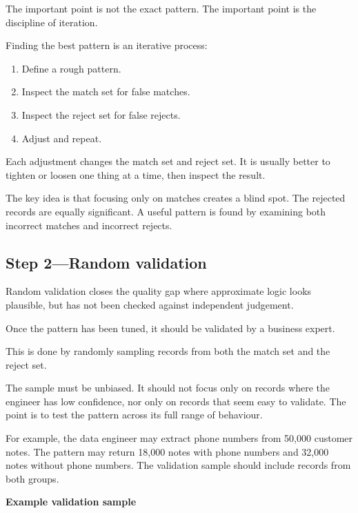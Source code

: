 \documentclass[10pt,openany,10pt]{book}
\providecommand{\tightlist}{%
  \setlength{\itemsep}{0pt}\setlength{\parskip}{0pt}}
\begin{document}
The important point is not the exact pattern. The important point is the
discipline of iteration.

Finding the best pattern is an iterative process:

\begin{enumerate}
\def\labelenumi{\arabic{enumi}.}
\tightlist
\item
  Define a rough pattern.
\item
  Inspect the match set for false matches.
\item
  Inspect the reject set for false rejects.
\item
  Adjust and repeat.
\end{enumerate}

Each adjustment changes the match set and reject set. It is usually
better to tighten or loosen one thing at a time, then inspect the
result.

The key idea is that focusing only on matches creates a blind spot. The
rejected records are equally significant. A useful pattern is found by
examining both incorrect matches and incorrect rejects.

\subsection{Step 2---Random validation}\label{step-2random-validation}

Random validation closes the quality gap where approximate logic looks
plausible, but has not been checked against independent judgement.

Once the pattern has been tuned, it should be validated by a business
expert.

This is done by randomly sampling records from both the match set and
the reject set.

The sample must be unbiased. It should not focus only on records where
the engineer has low confidence, nor only on records that seem easy to
validate. The point is to test the pattern across its full range of
behaviour.

For example, the data engineer may extract phone numbers from 50,000
customer notes. The pattern may return 18,000 notes with phone numbers
and 32,000 notes without phone numbers. The validation sample should
include records from both groups.

\textbf{Example validation sample}
\end{document}
